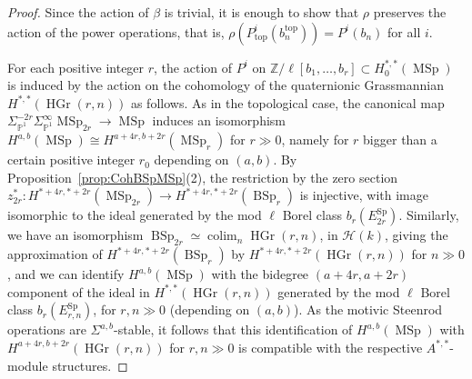 \documentclass[10pt]{amsart}
\theoremstyle{definition}
\theoremstyle{plain}
\numberwithin{equation}{section}
\newcommand{\0}{\emptyset}
\newcommand{\sH}{{\mathcal H}}
\renewcommand{\P}{{\mathbb P}}
\newcommand{\MSp}{{\operatorname{MSp}}}
\newcommand{\BSp}{{\operatorname{BSp}}}
\newcommand{\Sp}{{\operatorname{Sp}}}
\newcommand{\HGr}{{\operatorname{HGr}}}
\renewcommand{\top}{{\operatorname{top}}}
\newcommand{\colim}{{\operatorname*{colim}}}
\begin{document}
\begin{proof}
    Since the action of $\beta$ is trivial, it is enough to show that $\rho$ preserves the action of the power operations, that is, $\rho(P^i_{\top}(b_n^{\top}))=P^i(b_n)$ for all $i$.

    For each positive integer $r$, the action of $P^i$ on $\mathbb{Z}/\ell[b_1,\ldots,b_r]\subset H^{*,*}_0(\MSp)$ is induced by the action on the cohomology of the quaternionic Grassmannian $H^{*,*}(\HGr(r,n))$ as follows. As in the topological case, the canonical map $\Sigma_{\P^1}^{-2r}\Sigma^\infty_{\P^1}\MSp_{2r}\to \MSp$ induces an isomorphism $H^{a,b}(\MSp)\cong H^{a+4r, b+2r}(\MSp_r)$ for $r\gg0$, namely for $r$ bigger than a certain positive integer $r_0$ depending on $(a,b)$. By Proposition~\ref{prop:CohBSpMSp}(2), the restriction by the zero section $z_{2r}^*:H^{*+4r, *+2r}
    (\MSp_{2r})\to H^{*+4r, *+2r}
    (\BSp_r)$ is injective, with image isomorphic to the ideal generated by the mod $\ell$ Borel class $b_r(E^\Sp_{2r})$. Similarly, we have an isomorphism $\BSp_{2r}\simeq \colim_n\HGr(r, n)$, in $\sH(k)$, giving the approximation of $H^{*+4r, *+2r}
    (\BSp_r)$ by $H^{*+4r, *+2r}(\HGr(r, n))$ for $n\gg0$, and we can identify $H^{a,b}(\MSp)$ with the bidegree $(a+4r, a+2r)$ component of the ideal in $H^{*, *}(\HGr(r, n))$ generated by the mod $\ell$ Borel class $b_r(E^\Sp_{r,n})$, for $r,n\gg0$ (depending on $(a,b)$). As the motivic Steenrod operations are $\Sigma^{a,b}$-stable, it follows that this identification of $H^{a,b}(\MSp)$ with $H^{a+4r, b+2r}(\HGr(r, n))$ for $r,n\gg0$ is compatible with the respective $A^{*,*}$-module structures. 


\end{proof}
\end{document}
